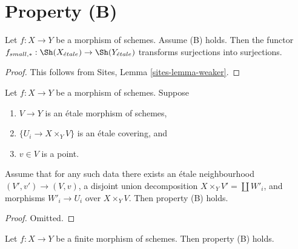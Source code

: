 \section{Property (B)}
\label{section-B}

\begin{lemma}
\label{lemma-property-B-implies}
Let $f : X \to Y$ be a morphism of schemes. Assume (B) holds.
Then the functor
$f_{small, *} :
\Sh(X_{\acute{e}tale})
\to
\Sh(Y_{\acute{e}tale})$
transforms surjections into surjections.
\end{lemma}

\begin{proof}
This follows from
Sites, Lemma \ref{sites-lemma-weaker}.
\end{proof}

\begin{lemma}
\label{lemma-simplify-B}
Let $f : X \to Y$ be a morphism of schemes. Suppose
\begin{enumerate}
\item $V \to Y$ is an \'etale morphism of schemes,
\item $\{U_i \to X \times_Y V\}$ is an \'etale covering, and
\item $v \in V$ is a point.
\end{enumerate}
Assume that for any such data there exists an \'etale neighbourhood
$(V', v') \to (V, v)$, a disjoint union decomposition
$X \times_Y V' = \coprod W'_i$, and morphisms $W'_i \to U_i$
over $X \times_Y V$. Then property (B) holds.
\end{lemma}

\begin{proof}
Omitted.
\end{proof}

\begin{lemma}
\label{lemma-finite-B}
Let $f : X \to Y$ be a finite morphism of schemes.
Then property (B) holds.
\end{lemma}

